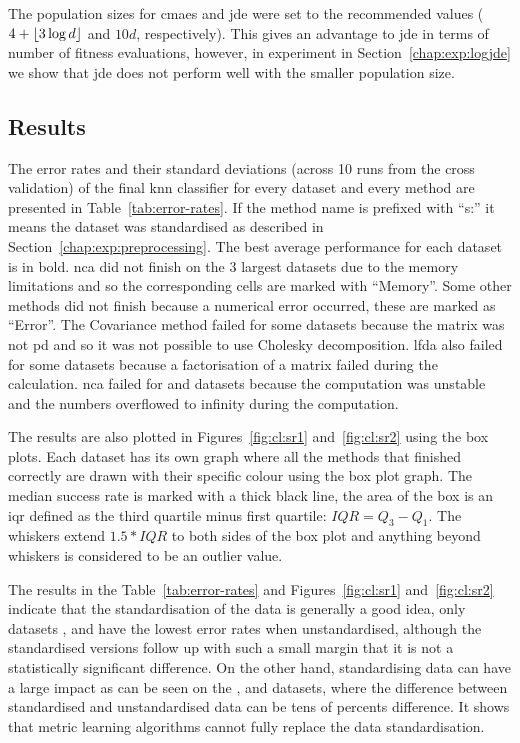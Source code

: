 \documentclass[12pt,a4paper]{report}
\begin{document}
The population sizes for \ac{cmaes} and \ac{jde} were set to the recommended values ($4+\lfloor3\log{d}\rfloor$ and $10d$, respectively). This gives an advantage to \ac{jde} in terms of number of fitness evaluations, however, in experiment in Section~\ref{chap:exp:logjde} we show that \ac{jde} does not perform well with the smaller population size.

\subsection{Results}

The error rates and their standard deviations (across 10 runs from the cross validation) of the final \ac{knn} classifier for every dataset and every method are presented in Table~\ref{tab:error-rates}. If the method name is prefixed with ``s:'' it means the dataset was standardised as described in Section~\ref{chap:exp:preprocessing}. The best average performance for each dataset is in bold. \ac{nca} did not finish on the 3 largest datasets due to the memory limitations and so the corresponding cells are marked with ``Memory''. Some other methods did not finish because a numerical error occurred, these are marked as ``Error''. The Covariance method failed for some datasets because the matrix was not \ac{pd} and so it was not possible to use Cholesky decomposition. \ac{lfda} also failed for some datasets because a factorisation of a matrix failed during the calculation. \ac{nca} failed for  and  datasets because the computation was unstable and the numbers overflowed to infinity during the computation.



The results are also plotted in Figures~\ref{fig:cl:sr1} and~\ref{fig:cl:sr2} using the box plots. Each dataset has its own graph where all the methods that finished correctly are drawn with their specific colour using the box plot graph. The median success rate is marked with a thick black line, the area of the box is an \ac{iqr} defined as the third quartile minus first quartile: $IQR = Q_3 - Q_1$. The whiskers extend $1.5*IQR$ to both sides of the box plot and anything beyond whiskers is considered to be an outlier value.

The results in the Table~\ref{tab:error-rates} and Figures~\ref{fig:cl:sr1} and~\ref{fig:cl:sr2} indicate that the standardisation of the data is generally a good idea, only datasets ,  and  have the lowest error rates when unstandardised, although the standardised versions follow up with such a small margin that it is not a statistically significant difference. On the other hand, standardising data can have a large impact as can be seen on the ,  and  datasets, where the difference between standardised and unstandardised data can be tens of percents difference. It shows that metric learning algorithms cannot fully replace the data standardisation.
\end{document}
